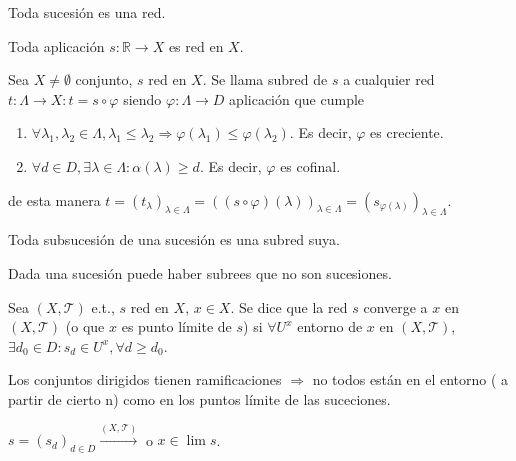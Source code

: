 \begin{ejm}
  Toda sucesión es una red.
\end{ejm}

\begin{ejm}
  Toda aplicación $s : \mathbb{R} \to X$ es red en $X$.
\end{ejm}

\begin{defn}[Subred]
  Sea $X \neq \emptyset$ conjunto, $s$ red en $X$. Se llama subred de $s$ a cualquier red $t : \Lambda \to X: t = s \circ \varphi$ siendo $\varphi : \Lambda \to D$ aplicación que cumple
  \begin{enumerate}[label=(\roman*)]
    \item $\forall \lambda_{1}, \lambda_{2} \in \Lambda, \lambda_{1} \leq \lambda_{2} \Rightarrow \varphi(\lambda_{1}) \leq \varphi(\lambda_{2})$. Es decir, $\varphi$ es creciente.
    \item $\forall d \in D, \exists \lambda \in \Lambda: \alpha(\lambda) \geq d$. Es decir, $\varphi$ es cofinal.
  \end{enumerate}
  de esta manera $t = (t_{\lambda})_{\lambda \in \Lambda} = ((s \circ \varphi)(\lambda))_{\lambda \in \Lambda} = (s_{\varphi(\lambda)})_{\lambda \in \Lambda}$.
\end{defn}

\begin{obs}
  Toda subsucesión de una sucesión es una subred suya.
\end{obs}

\begin{obs}
  Dada una sucesión puede haber subrees que no son sucesiones.
\end{obs}

\begin{defn}
  Sea $( X, \mathcal{T} )$ e.t., $s$ red en $X$, $x \in X$. Se dice que la red $s$ converge a $x$ en $( X, \mathcal{T} )$ (o que $x$ es punto límite de $s$) si $\forall U^{x}$ entorno de $x$ en $( X, \mathcal{T} )$, $\exists d_{0} \in D : s_{d} \in U^{x}, \forall d \geq d_{0}$.
\end{defn}

\begin{obs}
  Los conjuntos dirigidos tienen ramificaciones $\Rightarrow$ no todos están en el entorno ( a partir de cierto n) como en los puntos límite de las suceciones.
\end{obs}

\begin{nota}
  $s = ( s_{d} )_{d \in D} \xrightarrow[]{ ( X, \mathcal{T} ) }$ o $x \in \lim s$.
\end{nota}


